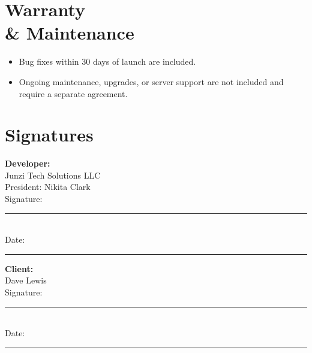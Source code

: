 \documentclass[11pt,letterpaper]{article}
\newcommand{\ClientName}{Dave Lewis}
\begin{document}
\section{Warranty \\& Maintenance}
\begin{itemize}[leftmargin=*]
\item Bug fixes within 30 days of launch are included.
\item Ongoing maintenance, upgrades, or server support are not included and require a separate agreement.
\end{itemize}

\vspace{2em}

\section*{Signatures}

\begin{minipage}{0.45\textwidth}
\textbf{Developer:}\\
Junzi Tech Solutions LLC\\
President: Nikita Clark\\[2em]
Signature: \rule{6cm}{0.4pt}\\[0.5em]
Date: \rule{4cm}{0.4pt}
\end{minipage}
\hfill
\begin{minipage}{0.45\textwidth}
\textbf{Client:}\\
\ClientName{}\\[3em]
Signature: \rule{6cm}{0.4pt}\\[0.5em]
Date: \rule{4cm}{0.4pt}
\end{minipage}
\end{document}
